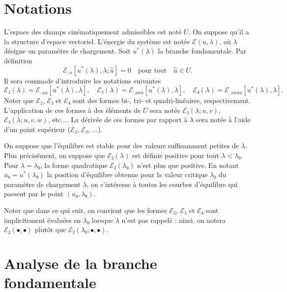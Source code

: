 \documentclass[12pt, final]{amsart}
\theoremstyle{definition}
\begin{document}
\title{\sbtitle}
\author{\sbauthor}
\address{\sbaddress}

\begin{abstract}
  blabla
\end{abstract}

\maketitle

\section{Notations}

L'espace des champs cinématiquement admissibles est noté $U$. On
suppose qu'il a la structure d'espace vectoriel. L'énergie du système
est notée $ℰ (u, λ)$, où $λ$ désigne un
paramètre de chargement. Soit $u^{\ast} (λ)$ la branche
fondamentale. Par définition
\begin{equation}
  ℰ_{, u} [u^{\ast} (λ), λ ; \hat{u}] = 0 \quad
  \text{pour tout} \quad \hat{u}∈U.
\end{equation}
Il sera commode d'introduire les notations suivantes
\begin{equation}
  ℰ₂ (λ) =ℰ_{, u  u}  [u^{\ast} (λ),
  λ], \quad ℰ₃ (λ) =ℰ_{, u  u
   u} [u^{\ast} (λ), λ], \quad ℰ₄ (λ)
  =ℰ_{, u  u  u  u} [u^{\ast} (λ),
  λ] .
\end{equation}
Noter que $ℰ₂$, $ℰ₃$ et $ℰ₄$ sont des formes
bi-, tri- et quadri-linéaires, respectivement. L'application de ces formes
à des éléments de $U$ sera notée $ℰ₂ (λ ; u,
v)$, $ℰ₃ (λ ; u, v, w)$, etc.... La dérivée de ces
formes par rapport à $λ$ sera notée à l'aide d'un point
supérieur ($\dot{ℰ₂}$, $\dot{ℰ₃}$, ...).

On suppose que l'équilibre est stable pour des valeurs suffisamment
petites de $λ$. Plus précisément, on suppose que $ℰ₂
(λ)$ est définie positive pour tout $λ < λ₀$. Pour
$λ = λ₀$, la forme quadratique $ℰ₂ (λ₀)$ n'est
plus que positive. En notant $u₀ = u^{\ast} (λ₀)$ la position
d'équilibre obtenue pour la valeur critique $λ₀$ du paramètre
de chargement $λ$, on s'intéresse à toutes les courbes
d'équilibre qui passent par le point $(u₀, λ₀)$.

Noter que dans ce qui suit, on convient que les formes $ℰ₂$,
$ℰ₃$ et $ℰ₄$ sont implicitement évaluées en
$λ₀$ lorsque $λ$ n'est pas rappelé : ainsi, on notera
$ℰ₂ (•, •)$ plutôt que $ℰ₂ (λ₀ ;
•, •)$.

\section{Analyse de la branche fondamentale}
\end{document}
